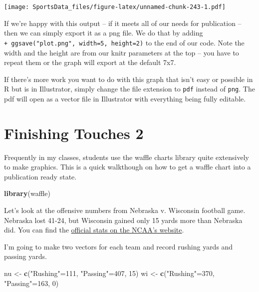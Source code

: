 \documentclass[]{book}
\newenvironment{Shaded}{\begin{snugshade}}{\end{snugshade}}
\newcommand{\KeywordTok}[1]{\textcolor[rgb]{0.13,0.29,0.53}{\textbf{#1}}}
\newcommand{\DecValTok}[1]{\textcolor[rgb]{0.00,0.00,0.81}{#1}}
\newcommand{\StringTok}[1]{\textcolor[rgb]{0.31,0.60,0.02}{#1}}
\newcommand{\NormalTok}[1]{#1}
\begin{document}
\texttt{[image: SportsData\_files/figure-latex/unnamed-chunk-243-1.pdf]}

If we're happy with this output -- if it meets all of our needs for
publication -- then we can simply export it as a png file. We do that by
adding \texttt{+\ ggsave("plot.png",\ width=5,\ height=2)} to the end of
our code. Note the width and the height are from our knitr parameters at
the top -- you have to repeat them or the graph will export at the
default 7x7.

If there's more work you want to do with this graph that isn't easy or
possible in R but is in Illustrator, simply change the file extension to
\texttt{pdf} instead of \texttt{png}. The pdf will open as a vector file
in Illustrator with everything being fully editable.

\chapter{Finishing Touches 2}\label{finishing-touches-2}

Frequently in my classes, students use the waffle charts library quite
extensively to make graphics. This is a quick walkthough on how to get a
waffle chart into a publication ready state.

\begin{Shaded}
\begin{Highlighting}[]
\KeywordTok{library}\NormalTok{(waffle)}
\end{Highlighting}
\end{Shaded}

Let's look at the offensive numbers from Nebraska v. Wisconsin football
game. Nebraska lost 41-24, but Wisconsin gained only 15 yards more than
Nebraska did. You can find the
\href{https://www.ncaa.com/game/football/fbs/2018/10/06/nebraska-wisconsin/team-stats}{official
stats on the NCAA's website}.

I'm going to make two vectors for each team and record rushing yards and
passing yards.

\begin{Shaded}
\begin{Highlighting}[]
\NormalTok{nu <-}\StringTok{ }\KeywordTok{c}\NormalTok{(}\StringTok{"Rushing"}\NormalTok{=}\DecValTok{111}\NormalTok{, }\StringTok{"Passing"}\NormalTok{=}\DecValTok{407}\NormalTok{, }\DecValTok{15}\NormalTok{)}
\NormalTok{wi <-}\StringTok{ }\KeywordTok{c}\NormalTok{(}\StringTok{"Rushing"}\NormalTok{=}\DecValTok{370}\NormalTok{, }\StringTok{"Passing"}\NormalTok{=}\DecValTok{163}\NormalTok{, }\DecValTok{0}\NormalTok{)}
\end{Highlighting}
\end{Shaded}
\end{document}
